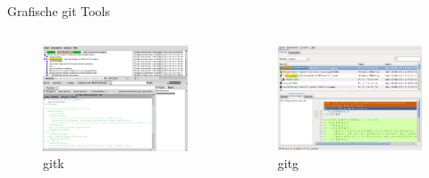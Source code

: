 \begin{frame}[allowframebreaks]{Grafische git Tools}
  \begin{columns}
    \begin{column}{0.56\textwidth}
      \begin{figure}
        \includegraphics[width=\textwidth]{img/gitk}
        \caption{gitk}
      \end{figure}
    \end{column}
    \begin{column}{0.56\textwidth}
      \begin{figure}
        \includegraphics[width=\textwidth]{img/gitg}
        \caption{gitg}
      \end{figure}
    \end{column}
  \end{columns}
  

\end{frame}
